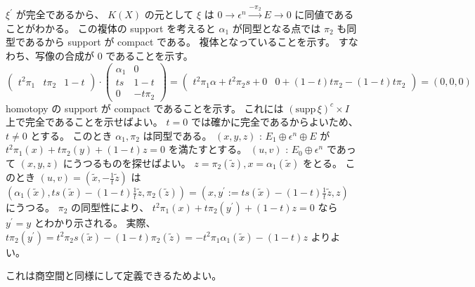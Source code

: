 \documentclass[dvipdfmx]{jsarticle}
\begin{document}
\begin{Proof}[複体と代表元(1)]
  \(\xi^\prime\) が完全であるから、 \(K(X)\) の元として \(\xi\) は \(0 \to \epsilon^n \overset{-\pi_2}{\to} E \to 0\) に同値であることがわかる。
  この複体の support を考えると \(\alpha_1\) が同型となる点では \(\pi_2\) も同型であるから support が compact である。
\itemthen
  複体となっていることを示す。
  すなわち、写像の合成が \(0\) であることを示す。
  \[
    \begin{pmatrix}
      t^2 \pi_1 & t \pi_2 & 1 - t
    \end{pmatrix} \cdot \begin{pmatrix}
      \alpha_1 & 0\\
      t s & 1 - t \\
      0 & - t \pi_2
    \end{pmatrix} =
    \begin{pmatrix}
      t^2 \pi_1 \alpha + t^2 \pi_2 s + 0 & 0 + (1-t) t \pi_2 - (1-t) t \pi_2
    \end{pmatrix} = (0,0,0)
  \]
\itemthen
  homotopy の support が compact であることを示す。
  これには \((\text{supp} \, \xi)^c \times I\) 上で完全であることを示せばよい。
  \(t=0\) では確かに完全であるからよいため、 \(t \not = 0\) とする。
  このとき \(\alpha_1 , \pi_2\) は同型である。
  \((x,y,z)\) : \(E_1 \oplus \epsilon^n \oplus E\) が \(t^2 \pi_1(x) + t \pi_2(y) + (1-t) z = 0\) を満たすとする。
  \((u,v)\) : \(E_0 \oplus \epsilon^n\) であって \((x,y,z)\) にうつるものを探せばよい。
  \(z = \pi_2(\tilde{z}) , x = \alpha_1(\tilde{x})\) をとる。
  このとき \((u,v) = (\tilde{x} , - \frac{1}{t} \tilde{z})\) は \((\alpha_1(\tilde{x}) , t s(\tilde{x}) - (1-t) \frac{1}{t} \tilde{z} , \pi_2(\tilde{z})) = (x , y^\prime := t s(\tilde{x}) - (1-t) \frac{1}{t} \tilde{z} , z)\) にうつる。
  \(\pi_2\) の同型性により、 \(t^2 \pi_1(x) + t \pi_2(y^\prime) + (1-t) z = 0\) なら \(y^\prime = y\) とわかり示される。
  実際、 \(t \pi_2(y^\prime) = t^2 \pi_2 s(\tilde{x}) - (1-t) \pi_2(\tilde{z}) = - t^2 \pi_1 \alpha_1 (\tilde{x}) - (1-t) z\) よりよい。
\end{Proof}

\begin{Proof}[(2)]
\itemprof
  これは商空間と同様にして定義できるためよい。
\end{Proof}
\end{document}
